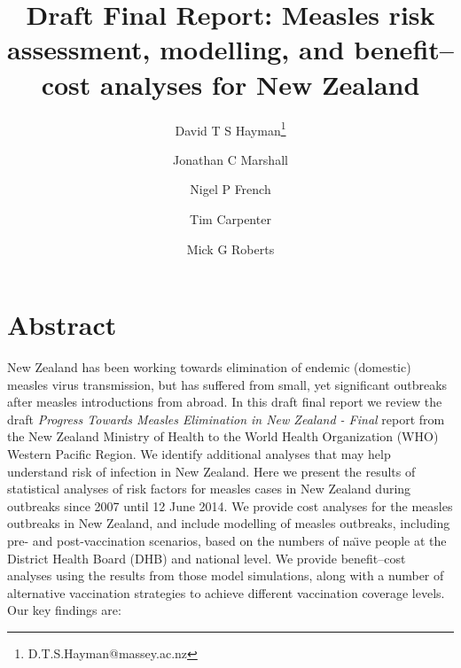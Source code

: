 \documentclass{article}
\begin{document}


\title{Draft Final Report: Measles risk assessment, modelling, and benefit--cost analyses for New Zealand}
\author[1]{David T S Hayman\thanks{D.T.S.Hayman@massey.ac.nz}}
\author[1] {Jonathan C Marshall}
\author[1] {Nigel P French}
\author[2] {Tim Carpenter}
\author[3] {Mick G Roberts}
\date{}
\maketitle

\section{Abstract}

New Zealand has been working towards elimination of endemic (domestic) measles virus transmission, but has suffered from small, yet significant outbreaks after measles introductions from abroad. In this draft final report we review the draft \emph {Progress Towards Measles Elimination in New Zealand - Final} report from the New Zealand Ministry of Health to the World Health Organization (WHO) Western Pacific Region. We identify additional analyses that may help understand risk of infection in New Zealand. Here we present the results of statistical analyses of risk factors for measles cases in New Zealand during outbreaks since 2007 until 12 June 2014. We provide cost analyses for the measles outbreaks in New Zealand, and include modelling of measles outbreaks, including pre- and post-vaccination scenarios, based on the numbers of na\"{\i}ve people at the District Health Board (DHB) and national level. We provide benefit--cost analyses using the results from those model simulations, along with a number of alternative vaccination strategies to achieve different vaccination coverage levels. Our key findings are:
\end{document}
